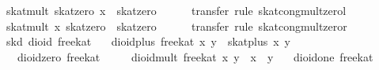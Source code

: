 \begin{isabellebody}
\ {}skat{}mult\ skat{}zero\ x\ {}\ skat{}zero{}\isanewline
\ \ \ \ \isamarkupfalse%
\ {}transfer{}\ rule\ skat{}cong{}mult{}zerol{}\isanewline
\ \ \isamarkupfalse%
\ {}skat{}mult\ x\ skat{}zero\ {}\ skat{}zero{}\isanewline
\ \ \ \ \isamarkupfalse%
\ {}transfer{}\ rule\ skat{}cong{}mult{}zeror{}\isanewline
{}\isamarkupfalse%
%
\endisatagproof
{\isafoldproof}%
%
\isadelimproof
\isanewline
%
\endisadelimproof
\isanewline
{}\isamarkupfalse%
\ skd{}\ dioid\ free{}kat\isanewline
\ \ \ {}dioid{}plus\ free{}kat\ x\ y\ {}\ skat{}plus\ x\ y{}\isanewline
\ \ \ {}dioid{}zero\ free{}kat\ {}\ {}{}\isanewline
\ \ \ {}dioid{}mult\ free{}kat\ x\ y\ {}\ x\ {}\ y{}\isanewline
\ \ \ {}dioid{}one\ free{}kat\ {}\ {}{}\isanewline

\end{isabellebody}
